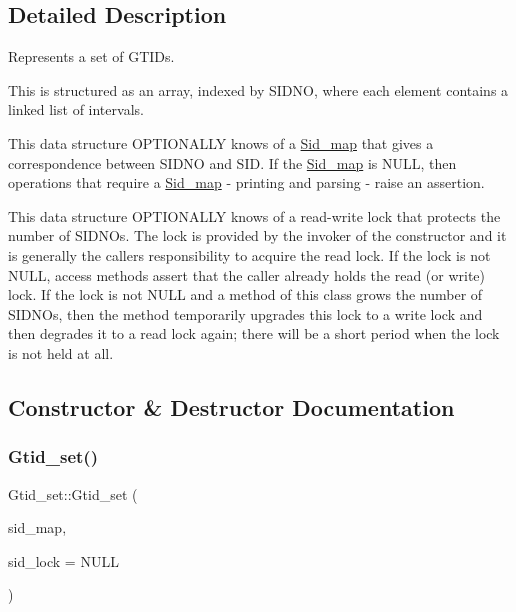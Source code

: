 \subsection{Detailed Description}
Represents a set of G\+T\+I\+Ds.

This is structured as an array, indexed by S\+I\+D\+NO, where each element contains a linked list of intervals.

This data structure O\+P\+T\+I\+O\+N\+A\+L\+LY knows of a \mbox{\hyperlink{classSid__map}{Sid\+\_\+map}} that gives a correspondence between S\+I\+D\+NO and S\+ID. If the \mbox{\hyperlink{classSid__map}{Sid\+\_\+map}} is N\+U\+LL, then operations that require a \mbox{\hyperlink{classSid__map}{Sid\+\_\+map}} -\/ printing and parsing -\/ raise an assertion.

This data structure O\+P\+T\+I\+O\+N\+A\+L\+LY knows of a read-\/write lock that protects the number of S\+I\+D\+N\+Os. The lock is provided by the invoker of the constructor and it is generally the caller\textquotesingle{}s responsibility to acquire the read lock. If the lock is not N\+U\+LL, access methods assert that the caller already holds the read (or write) lock. If the lock is not N\+U\+LL and a method of this class grows the number of S\+I\+D\+N\+Os, then the method temporarily upgrades this lock to a write lock and then degrades it to a read lock again; there will be a short period when the lock is not held at all. 

\subsection{Constructor \& Destructor Documentation}
\mbox{\label{classGtid__set_a048d3934c095e4afed99055334367047}} 
\subsubsection{\texorpdfstring{Gtid\+\_\+set()}{Gtid\_set()}\hspace{0.1cm}{\footnotesize\ttfamily [1/2]}}
{\footnotesize\ttfamily Gtid\+\_\+set\+::\+Gtid\+\_\+set (\begin{DoxyParamCaption}\item[{\mbox{\hyperlink{classSid__map}{Sid\+\_\+map}} $\ast$}]{sid\+\_\+map,  }\item[{\mbox{\hyperlink{classCheckable__rwlock}{Checkable\+\_\+rwlock}} $\ast$}]{sid\+\_\+lock = {\ttfamily NULL} }\end{DoxyParamCaption})}

